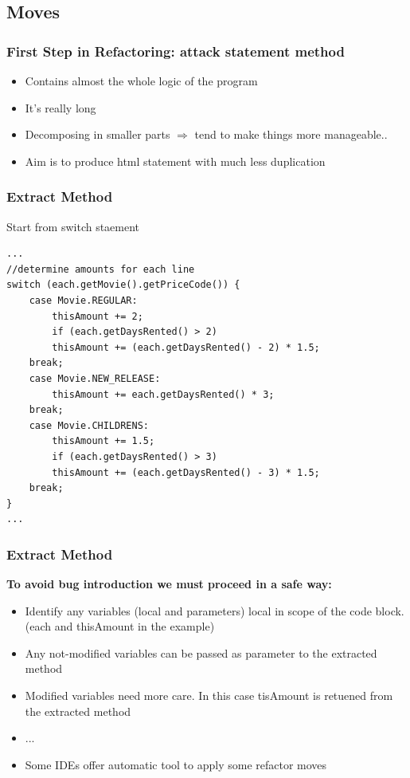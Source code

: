 \documentclass{beamer}
\begin{document}
\subsection{Moves}
\begin{frame}
  \frametitle{First Step in Refactoring: attack statement method}
   \begin{itemize}
  		\item Contains almost the whole logic of the program
		\item It's really long
		\item Decomposing in smaller parts $\Rightarrow$ tend to make things more manageable..
		\item Aim is to produce html statement with much less duplication
  \end{itemize}
\end{frame}

\begin{frame}[containsverbatim]
	\frametitle{Extract Method}
	Start from switch staement \\
	\begin{lstlisting}
...
//determine amounts for each line
switch (each.getMovie().getPriceCode()) {
	case Movie.REGULAR:
		thisAmount += 2;
		if (each.getDaysRented() > 2)
		thisAmount += (each.getDaysRented() - 2) * 1.5;
	break;
	case Movie.NEW_RELEASE:
		thisAmount += each.getDaysRented() * 3;
	break;
	case Movie.CHILDRENS:
		thisAmount += 1.5;
		if (each.getDaysRented() > 3)
		thisAmount += (each.getDaysRented() - 3) * 1.5;
	break;
}
...
\end{lstlisting}
\end{frame}

\begin{frame}
  \frametitle{Extract Method}
  \textbf{To avoid bug introduction we must proceed in a safe way:}
   \begin{itemize}
  		\item Identify any variables (local and parameters) local in scope of the code block. (each and thisAmount in the example)
		\item Any not-modified variables can be passed as parameter to the extracted method
		\item Modified variables need more care. In this case tisAmount is retuened from the extracted method
		\item ...		
		\item Some IDEs offer automatic tool to apply some refactor moves
  \end{itemize}
\end{frame}
\end{document}
